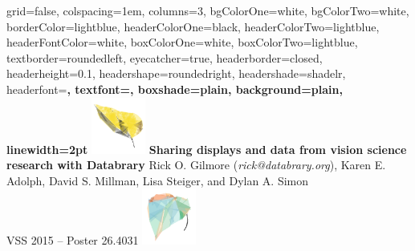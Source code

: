 \documentclass[landscape,final,a0paper,fontscale=0.285]{baposter}
\begin{document}


\begin{poster}%
  {
  grid=false,
  colspacing=1em,
  columns=3,
  bgColorOne=white,
  bgColorTwo=white,
  borderColor=lightblue,
  headerColorOne=black,
  headerColorTwo=lightblue,
  headerFontColor=white,
  boxColorOne=white,
  boxColorTwo=lightblue,
  textborder=roundedleft,
  eyecatcher=true,
  headerborder=closed,
  headerheight=0.1\textheight,
  headershape=roundedright,
  headershade=shadelr,
  headerfont=\Large\bf\textsc, %
  textfont={\setlength{\parindent}{1.5em}},
  boxshade=plain,
  background=plain,
  linewidth=2pt
  }
  {
    \includegraphics[height=5em]{img/datavyu-leaf-large.png}
  } 
  {\bf{Sharing displays and data from vision science research with Databrary} }
  {Rick O. Gilmore (\emph{rick@databrary.org}), Karen E. Adolph, David S. Millman, Lisa Steiger, and Dylan A. Simon \\
  VSS 2015 -- Poster 26.4031}
  {
    \includegraphics[height=5em]{img/databrary-leaf-large.png}
  }



\end{poster}
\end{document}
